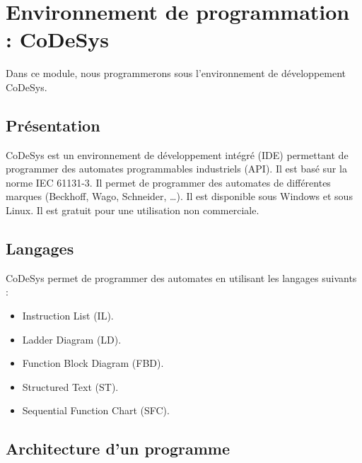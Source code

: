 \section{Environnement de programmation : CoDeSys}
    Dans ce module, nous programmerons sous l'environnement de développement CoDeSys. 
    \subsection{Présentation}
    CoDeSys est un environnement de développement intégré (IDE) permettant de programmer des automates programmables industriels (API). Il est basé sur la norme IEC 61131-3. Il permet de programmer des automates de différentes marques (Beckhoff, Wago, Schneider, \dots). Il est disponible sous Windows et sous Linux. Il est gratuit pour une utilisation non commerciale. 
    \subsection{Langages}
    CoDeSys permet de programmer des automates en utilisant les langages suivants : 
    \begin{itemize}
        \item Instruction List (IL).
        \item Ladder Diagram (LD).
        \item Function Block Diagram (FBD).
        \item Structured Text (ST).
        \item Sequential Function Chart (SFC).
    \end{itemize}
    \subsection{Architecture d'un programme}

